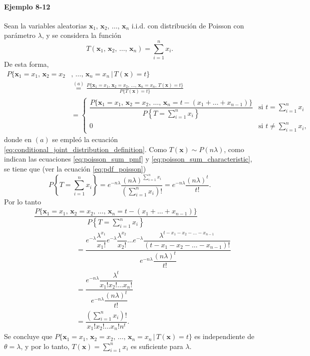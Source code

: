 \documentclass[a4paper]{report}
\newcommand{\x}{\mathbf{x}}
\begin{document}
\paragraph{Ejemplo 8-12} Sean la variables aleatorias \(\x_1,\,\x_2,\,\dots,\,\x_n\) i.i.d. con distribución de Poisson con parámetro \(\lambda\), y se considera la función 
\[
 T(\x_1,\,\x_2,\,\dots,\,\x_n)=\sum_{i=1}^nx_i.
\]
De esta forma,
\begin{align*}
 P\{\x_1=x_1,\,\x_2=x_2&,\,\dots,\,\x_n=x_n\,|\,T(\x)=t\}\\
  &\overset{(a)}{=}\frac{P\{\x_1=x_1,\,\x_2=x_2,\,\dots,\,\x_n=x_n,\,T(\x)=t\}}{P\{T(\x)=t\}}\\
  &=\left\{\begin{array}{ll}
      \dfrac{P\{\x_1=x_1,\,\x_2=x_2,\,\dots,\,\x_n=t-(x_1+\dots+x_{n-1})\}}{\displaystyle P\left\{T=\sum_{i=1}^nx_i\right\}} &\displaystyle\textrm{si }t=\sum_{i=1}^nx_i\\
      0 & \displaystyle\textrm{si }t\neq\sum_{i=1}^nx_i,
    \end{array}\right. 
\end{align*}
donde en \((a)\) se empleó la ecuación \ref{eq:conditional_joint_distribution_definition}.
Como \(T(\x)\sim P(n\lambda)\), como indican las ecuaciones \ref{eq:poisson_sum_pmf} y \ref{eq:poisson_sum_characteristic}, se tiene que (ver la ecuación \ref{eq:pdf_poisson})
\[
 P\left\{T=\sum_{i=1}^nx_i\right\}=e^{-n\lambda}\frac{(n\lambda)^{\sum_{i=1}^nx_i}}{\left(\displaystyle\sum_{i=1}^nx_i\right)!}=e^{-n\lambda}\frac{(n\lambda)^t}{t!}.
\]
Por lo tanto
\begin{align*}
 &\dfrac{P\{\x_1=x_1,\,\x_2=x_2,\,\dots,\,\x_n=t-(x_1+\dots+x_{n-1})\}}{\displaystyle P\left\{T=\sum_{i=1}^nx_i\right\}}\\
 &\qquad\qquad\qquad=\dfrac{e^{-\lambda}\dfrac{\lambda^{x_1}}{x_1!}e^{-\lambda}\dfrac{\lambda^{x_2}}{x_2!}\dots e^{-\lambda}\dfrac{\lambda^{t-x_1-x_2-\dots-x_{n-1}}}{(t-x_1-x_2-\dots-x_{n-1})!}}{e^{-n\lambda}\dfrac{(n\lambda)^t}{t!}}\\
 &\qquad\qquad\qquad=\dfrac{e^{-n\lambda}\dfrac{\lambda^t}{x_1!x_2!\dots x_n!}}{{e^{-n\lambda}\dfrac{(n\lambda)^t}{t!}}}\\
 &\qquad\qquad\qquad=\dfrac{\displaystyle\left(\displaystyle\sum_{i=1}^nx_i\right)!}{x_1!x_2!\dots x_n!n^t}.
\end{align*}
Se concluye que \(P\{\x_1=x_1,\,\x_2=x_2,\,\dots,\,\x_n=x_n\,|\,T(\x)=t\}\) es independiente de \(\theta=\lambda\), y por lo tanto, \(T(\x)=\sum_{i=1}^nx_i\) es suficiente para \(\lambda\).








\end{document}
